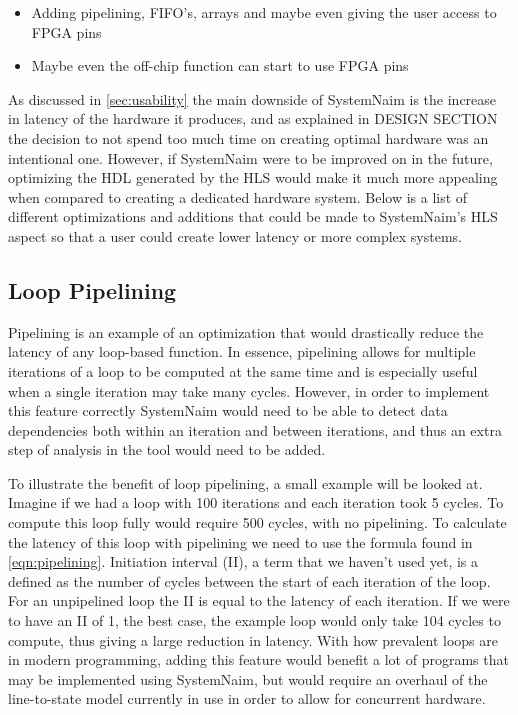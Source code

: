 \begin{itemize}
    \item Adding pipelining, FIFO's, arrays and maybe even giving the user access to FPGA pins
    \item Maybe even the off-chip function can start to use FPGA pins
\end{itemize}

As discussed in \autoref{sec:usability} the main downside of SystemNaim is the increase in latency of the hardware it produces, and as explained in DESIGN SECTION the decision to not spend too much time on creating optimal hardware was an intentional one. However, if SystemNaim were to be improved on in the future, optimizing the HDL generated by the HLS would make it much more appealing when compared to creating a dedicated hardware system. Below is a list of different optimizations and additions that could be made to SystemNaim's HLS aspect so that a user could create lower latency or more complex systems.

\subsection{Loop Pipelining}

Pipelining is an example of an optimization that would drastically reduce the latency of any loop-based function. In essence, pipelining allows for multiple iterations of a loop to be computed at the same time and is especially useful when a single iteration may take many cycles. However, in order to implement this feature correctly SystemNaim would need to be able to detect data dependencies both within an iteration and between iterations, and thus an extra step of analysis in the tool would need to be added. 

To illustrate the benefit of loop pipelining, a small example will be looked at. Imagine if we had a loop with 100 iterations and each iteration took 5 cycles. To compute this loop fully would require 500 cycles, with no pipelining. To calculate the latency of this loop with pipelining we need to use the formula found in \autoref{eqn:pipelining}. Initiation interval (II), a term that we haven't used yet, is a defined as the number of cycles between the start of each iteration of the loop. For an unpipelined loop the II is equal to the latency of each iteration. If we were to have an II of 1, the best case, the example loop would only take 104 cycles to compute, thus giving a large reduction in latency. With how prevalent loops are in modern programming, adding this feature would benefit a lot of programs that may be implemented using SystemNaim, but would require an overhaul of the line-to-state model currently in use in order to allow for concurrent hardware.

